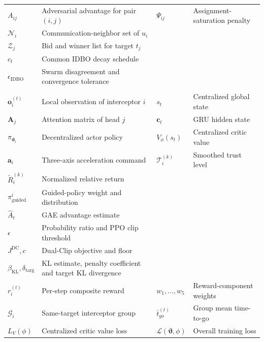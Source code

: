 \documentclass[lettersize,journal]{IEEEtran}
\begin{document}
\begin{table}[!ht]
{\begin{tabular}{@{}
>{\centering\arraybackslash}m{0.70in}
>{\raggedright\arraybackslash}m{0.92in}
>{\centering\arraybackslash}m{0.70in}
>{\raggedright\arraybackslash}m{0.92in}@{}}
$A_{ij}$
& Adversarial advantage for pair $(i,j)$
& $\Psi_{ij}$
& Assignment-saturation penalty \\

$\mathcal{N}_i$
& Communication-neighbor set of $u_i$
& \shortstack{$c_{ij}$\\$\mathcal{Z}_j$}
& Bid and winner list for target $t_j$ \\

$c_t$
& Common IDBO decay schedule
& \shortstack{$\Gamma^{(k)}$\\$\epsilon_{\mathrm{IDBO}}$}
& Swarm disagreement and convergence tolerance \\[2pt]

\multicolumn{4}{@{}l}{\textit{ART-MAPPO cooperative guidance}}\\[1pt]

$\mathbf{o}_i^{(t)}$
& Local observation of interceptor $i$
& $s_t$
& Centralized global state \\

$\mathbf{A}_j$
& Attention matrix of head $j$
& $\mathbf{c}_t$
& GRU hidden state \\

$\pi_{\boldsymbol{\vartheta}_i}$
& Decentralized actor policy
& $V_\phi(s_t)$
& Centralized critic value \\

$\mathbf{a}_i$
& Three-axis acceleration command
& $\mathcal{T}_i^{(k)}$
& Smoothed trust level \\

$\tilde{R}_i^{(k)}$
& Normalized relative return
& \shortstack{$\beta(\mathcal{T}_i)$\\
$\pi_{\mathrm{guided}}^i$}
& Guided-policy weight and distribution \\

$\hat{A}_t$
& GAE advantage estimate
& \shortstack{$r_t(\boldsymbol{\vartheta})$\\$\epsilon$}
& Probability ratio and PPO clip threshold \\

$J^{\mathrm{DC}},c$
& Dual-Clip objective and floor
& \shortstack{$\hat{D}_{\mathrm{KL}}$\\
$\beta_{\mathrm{KL}},\delta_{\mathrm{targ}}$}
& KL estimate, penalty coefficient and target KL divergence \\

$r_i^{(t)}$
& Per-step composite reward
& $w_1,\ldots,w_5$
& Reward-component weights \\

$\mathcal{G}_i$
& Same-target interceptor group
& $\bar{t}_{go}^{(t)}$
& Group mean time-to-go \\

$L_V(\phi)$
& Centralized critic value loss
& $\mathcal{L}(\boldsymbol{\vartheta},\phi)$
& Overall training loss \\

\bottomrule
\end{tabular}
}
\end{table}
\end{document}

